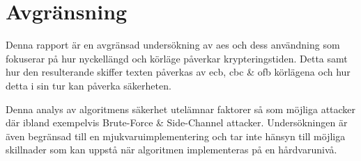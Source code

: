 \section{Avgränsning} %

Denna rapport är en avgränsad undersökning av \acrshort{aes} och dess användning som fokuserar
 på hur nyckellängd och körläge påverkar krypteringstiden. Detta samt hur den resulterande
skiffer texten påverkas av \acrshort{ecb}, \acrshort{cbc} \& \acrshort{ofb} körlägena och hur detta i sin tur kan påverka säkerheten. \par

Denna analys av algoritmens säkerhet utelämnar faktorer så som möjliga attacker där ibland exempelvis Brute-Force
\& Side-Channel attacker. Undersökningen är även
begränsad till en mjukvaruimplementering och tar inte hänsyn till möjliga skillnader som kan uppstå
när algoritmen implementeras på en hårdvarunivå.